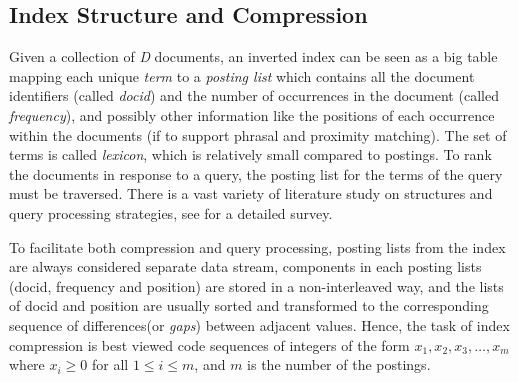 \documentclass{sig-alternate-05-2015}
\begin{document}
\subsection{Index Structure and Compression}
Given a collection of \textit{D} documents, an inverted index can be seen as a big table mapping each unique \textit{term} to a\textit{ posting list} which contains all the document identifiers (called \textit{docid}) and the number of occurrences in the document (called \textit{frequency}), and possibly other information like the positions of each occurrence within the documents (if to support phrasal and proximity matching).
The set of terms is called \textit{lexicon}, which is relatively small compared to postings.
To rank the documents in response to a query, the posting list for the terms of the query must be traversed.
There is a vast variety of literature study on structures and query processing strategies, see \cite{ding2011faster,konow2013faster,navarro2010dual} for a detailed survey.


To facilitate both compression and query processing, posting lists from the index are always considered separate data stream, components in each posting lists (docid, frequency and position) are stored in a non-interleaved way, and the lists of docid and position are usually sorted and transformed to the corresponding sequence of differences(or \textit{gaps}) between adjacent values.
Hence, the task of index compression is best viewed code sequences of integers of the form $ x_{1}, x_{2}, x_{3},\ldots, x_{m} $ where $ x_{i}\geqslant0 $ for all $ 1\leqslant i\leqslant m $, and $ m $ is the number of the postings.
\end{document}
